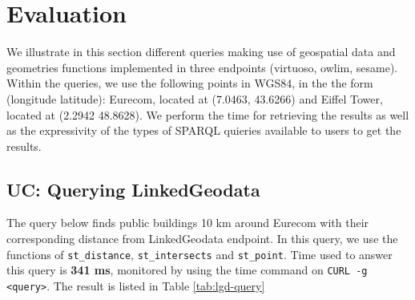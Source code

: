 \begin{table}[!htbp]
\end{table}


\section{Evaluation}
\label{sec:geoqueries}

We illustrate in this section different queries making use of geospatial data and geometries functions implemented in three endpoints (virtuoso, owlim, sesame). Within the queries, we use the following points in WGS84, in the the form (longitude latitude): Eurecom, located at (7.0463, 43.6266) and Eiffel Tower, located at (2.2942 48.8628). We perform the time for retrieving the results as well as the expressivity of the types of SPARQL quieries available to users to get the results.

\subsection{UC: Querying LinkedGeodata}
\label{sec:linkedgeodata}

The query below finds public buildings 10 km around Eurecom with their corresponding distance from LinkedGeodata endpoint. In this query, we use the functions of \texttt{st\_distance}, \texttt{st\_intersects} and \texttt{st\_point}. Time used to answer this query is \textbf{341 ms}, monitored by using the time command on \texttt{CURL -g <query>}. The result is listed in Table \ref{tab:lgd-query}

